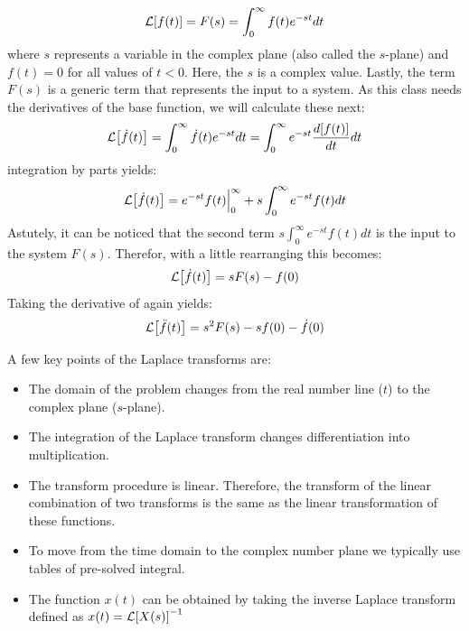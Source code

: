 \documentclass[12pt,letter]{article}
\begin{document}
\begin{review}
		\begin{equation}
				\mathcal{L}{\left[f(t)\right]} = F(s) = \int_{0}^{\infty} f(t)e^{-st}dt
		\end{equation}
		where $s$ represents a variable in the complex plane (also called the $s$-plane) and $f(t)=0$ for all values of $t<0$. Here, the $s$ is a complex value. Lastly, the term $F(s)$ is a generic term that  represents the input to a system. As this class needs the derivatives of the base function, we will calculate these next:
		\begin{equation}
			\mathcal{L}{\left[\dot{f}(t)\right]} = \int_{0}^{\infty} \dot{f}(t)e^{-st}dt = \int_{0}^{\infty} e^{-st}\frac{d[f(t)]}{dt}dt 
		\end{equation}		
		integration by parts yields:
		\begin{equation}
			\mathcal{L}{\left[\dot{f}(t)\right]} = e^{-st}f(t)\Big|_0^\infty+s\int_{0}^{\infty}e^{-st}f(t)dt
		\end{equation}
		Astutely, it can be noticed that the second term $s\int_{0}^{\infty}e^{-st}f(t)dt$
		is the input to the system $F(s)$. Therefor, with a little rearranging this becomes:
		\begin{equation}
			\mathcal{L}{\left[\dot{f}(t)\right]} = sF(s)-f(0)
		\end{equation}
		Taking the derivative of again yields:
		\begin{equation}
			\mathcal{L}{\left[\ddot{f}(t)\right]} = s^2F(s)-sf(0)-\dot{f}(0)
		\end{equation}
		
		A few key points of the Laplace transforms are:
				
		\begin{itemize}
			\item The domain of the problem changes from the real number line ($t$) to the complex plane ($s$-plane).
			\item The integration of the Laplace transform changes differentiation into multiplication.
			\item The transform procedure is linear. Therefore, the transform of the linear combination of two transforms is the same as the linear transformation of these functions. 
			\item To move from the time domain to the complex number plane we typically use tables of pre-solved integral. 
			\item The function $x(t)$ can be obtained by taking the inverse Laplace transform defined as $x(t) = \mathcal{L}{\left[X(s)\right]}^{-1}$
		\end{itemize}


\end{review}
\end{document}
